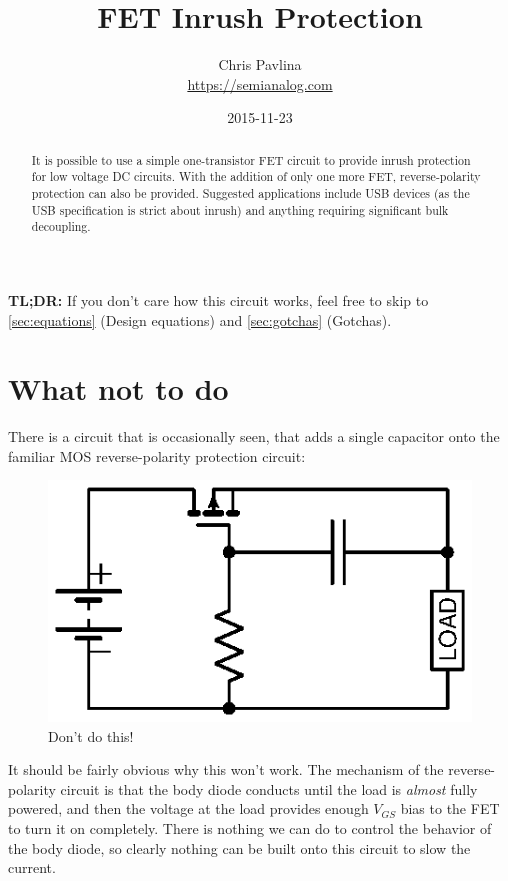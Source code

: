 \documentclass[letterpaper,12pt]{article}
\title{FET Inrush Protection}
\author{Chris Pavlina \\ \small \url{https://semianalog.com}}
\date{2015-11-23}
\begin{document}
\maketitle

\begin{abstract}
It is possible to use a simple one-transistor FET circuit to provide
inrush protection for low voltage DC circuits. With the addition of
only one more FET, reverse-polarity protection can also be provided.
Suggested applications include USB devices (as the USB specification
is strict about inrush) and anything requiring significant bulk
decoupling.
\end{abstract}

\begin{framed}
\textbf{TL;DR:} If you don't care how this circuit works, feel free to
skip to \cref{sec:equations} (Design equations) and \cref{sec:gotchas} (Gotchas).
\end{framed}

\tableofcontents

\section{What not to do}
\label{sec:bad}

There is a circuit that is occasionally seen\cite{elecdesign_rpp}, that adds a single capacitor
onto the familiar MOS reverse-polarity protection circuit:

\begin{figure}[H]
\centering
\includegraphics{what_not_to_do_1}
\caption{Don't do this!}
\end{figure}

It should be fairly obvious why this won't work. The mechanism of the reverse-polarity circuit
is that the body diode conducts until the load is \emph{almost} fully powered, and then the
voltage at the load provides enough $V_{GS}$ bias to the FET to turn it on completely. There
is nothing we can do to control the behavior of the body diode, so clearly nothing can be
built onto this circuit to slow the current.
\end{document}
